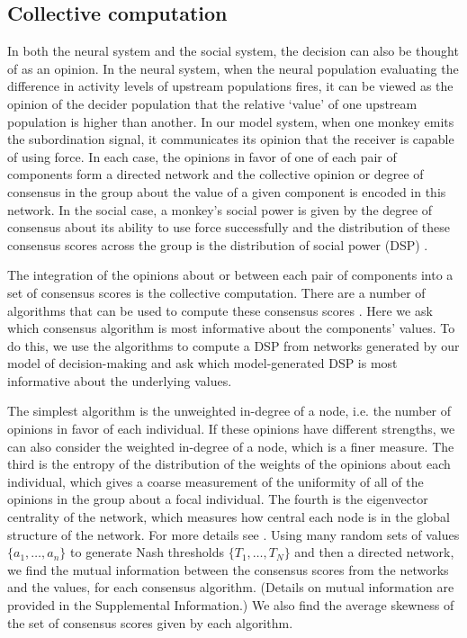 \documentclass{pnastwo}
\begin{document}
\begin{article}
\subsection{Collective computation}
\label{computation}
In both the neural system and the social system, the decision can also be thought of as an opinion. In the neural system, when the neural population evaluating the difference in activity levels of upstream populations fires, it can be viewed as the opinion of the decider population that the relative `value' of one upstream population is higher than another. In our model system, when one monkey emits the subordination signal, it communicates its opinion that the receiver is capable of using force. In each case, the opinions in favor of one of each pair of components form a directed network and the collective opinion or degree of consensus in the group about the value of a given component is encoded in this network. In the social case, a monkey's social power is given by the degree of consensus about its ability to use force successfully and the distribution of these consensus scores across the group is the distribution of social power (DSP)  \cite{Brush:2013fk, Flack:2006uq}.

The integration of the opinions about or between each pair of components into a set of consensus scores is the collective computation. There are a number of algorithms that can be used to compute these consensus scores \cite{Brush:2013fk, Flack:2006uq}.  Here we ask which consensus algorithm is most informative about the components' values. To do this, we use the algorithms to compute a DSP from networks generated by our model of decision-making and ask which model-generated DSP is most informative about the underlying values. 

The simplest algorithm is the unweighted in-degree of a node, i.e. the number of opinions in favor of each individual. If these opinions have different strengths, we can also consider the weighted in-degree of a node, which is a finer measure.  The third is the entropy of the distribution of the weights of the opinions about each individual, which gives a coarse measurement of the uniformity of all of the opinions in the group about a focal individual.  The fourth is the eigenvector centrality of the network, which measures how central each node is in the global structure of the network.  For more details see \cite{Brush:2013fk}. Using many random sets of values $\{a_1,\dots,a_n\}$ to generate Nash thresholds $\{T_1,\dots,T_N\}$ and then a directed network, we find the mutual information between the consensus scores from the networks and the values, for each consensus algorithm. (Details on mutual information are provided in the Supplemental Information.) We also find the average skewness of the set of consensus scores given by each algorithm.


\end{article}
\end{document}
